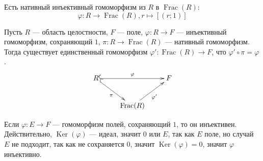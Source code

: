 \documentclass[12pt,a4paper]{article}
\DeclareMathOperator{\Ker}{Ker}
\DeclareMathOperator{\Frac}{Frac}
\begin{document}
    \begin{remark}
        Есть нативный инъективный гомоморфизм из $R$ в $\Frac(R)$:
        \[\varphi: R \to \Frac(R), r \mapsto [(r; 1)]\]
    \end{remark}

    \begin{theorem}
        Пусть $R$ --- область целостности, $F$ --- поле, $\varphi: R \to F$ --- инъективный гомоморфизм, сохраняющий $1$, $\pi: R \to \Frac(R)$ --- нативный гомоморфизм. Тогда существует единственный гомоморфизм $\varphi': \Frac(R) \to F$, что $\varphi' \circ \pi = \varphi$.
        \[
            \xymatrix{
                R \ar@{^{(}->}[rd]_{\pi} \ar@{^{(}->}[rr]^\varphi && F\\
                & \Frac(R) \ar[ur]_{\varphi'}
            }
        \]
    \end{theorem}

    \begin{remark}\label{field_homomorphism_remark}
        Если $\varphi: E \to F$ --- гомоморфизм полей, сохраняющий $1$, то он инъективен. Действительно, $\Ker(\varphi)$ --- идеал, значит ${0}$ или $E$, так как $E$ поле, но случай $E$ не подходит, так как не сохраняется $0$, значит $\Ker(\varphi) = {0}$, значит $\varphi$ инъективно.
    \end{remark}
\end{document}
